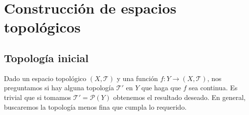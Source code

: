 \chapter{Construcción de espacios topológicos}
\section{Topología inicial}
Dado un espacio topológico $\displaystyle \left(X, \mathcal{T}\right) $ y una función $\displaystyle f : Y \to \left(X, \mathcal{T}\right) $, nos preguntamos si hay alguna topología $\displaystyle \mathcal{T}' $ en $\displaystyle Y $ que haga que $\displaystyle f $ sea continua. Es trivial que si tomamos $\displaystyle \mathcal{T}' = \mathcal{P}\left(Y\right) $ obtenemos el resultado deseado. En general, buscaremos la topología menos fina que cumpla lo requerido. 
 
